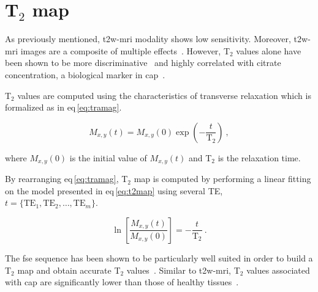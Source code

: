 \section{T$_2$ map} \label{subsec:chp2:imaging:t2}
As previously mentioned, \ac{t2w}-\ac{mri} modality shows low sensitivity.
Moreover, \ac{t2w}-\ac{mri} images are a composite of multiple effects~\cite{Hegde2013}.
However, T$_2$ values alone have been shown to be more discriminative~\cite{Liu2011} and highly correlated with citrate concentration, a biological marker in \ac{cap}~\cite{Liney1996,Liney1997}.

T$_2$ values are computed using the characteristics of transverse relaxation which is formalized as in \acs{eq}\,\eqref{eq:tramag}.

\begin{equation}
	M_{x,y}(t) = M_{x,y}(0) \exp \left( - \frac{t}{\text{T}_2} \right) \ ,
	\label{eq:tramag}
\end{equation}

\noindent where $M_{x,y}(0)$ is the initial value of $M_{x,y}(t)$ and T$_2$ is the relaxation time.

By rearranging \acs{eq}\,\eqref{eq:tramag}, T$_2$ map is computed by performing a linear fitting on the model presented in \acs{eq}\,\eqref{eq:t2map} using several TE, $t=\{ \text{TE}_1,\text{TE}_2, \dotsc ,\text{TE}_m \}$.

\begin{equation}
	\ln \left[ \frac{M_{x,y}(t)}{M_{x,y}(0)} \right] = - \frac{t}{\text{T}_2} \ .
	\label{eq:t2map}
\end{equation}

The \Ac{fse} sequence has been shown to be particularly well suited in order to build a T$_2$ map and obtain accurate T$_2$ values~\cite{Liney1996a}.
Similar to \ac{t2w}-\ac{mri}, T$_2$ values associated with \ac{cap} are significantly lower than those of healthy tissues~\cite{Liney1996,Gibbs2001}.

